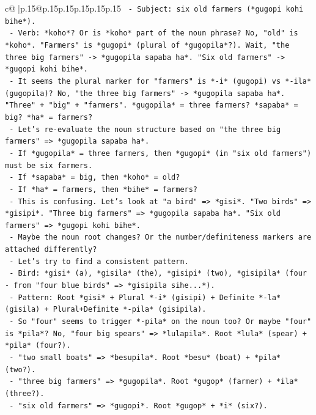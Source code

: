 \documentclass{article}
\begin{document}
{\begin{supertabular}{c@{$\;$}|p{.15\linewidth}@{}p{.15\linewidth}p{.15\linewidth}p{.15\linewidth}p{.15\linewidth}p{.15\linewidth}}
{{{\texttt{       {-} Subject: six old farmers (*gugopi kohi bihe*).} \\
\texttt{       {-} Verb: *koho*? Or is *koho* part of the noun phrase? No, "old" is *koho*. "Farmers" is *gugopi* (plural of *gugopila*?). Wait, "the three big farmers" {-}> *gugopila sapaba ha*. "Six old farmers" {-}> *gugopi kohi bihe*.} \\
\texttt{       {-} It seems the plural marker for "farmers" is *{-}i* (gugopi) vs *{-}ila* (gugopila)? No, "the three big farmers" {-}> *gugopila sapaba ha*. "Three" + "big" + "farmers". *gugopila* = three farmers? *sapaba* = big? *ha* = farmers?} \\
\texttt{       {-} Let's re{-}evaluate the noun structure based on "the three big farmers" => *gugopila sapaba ha*.} \\
\texttt{         {-} If *gugopila* = three farmers, then *gugopi* (in "six old farmers") must be six farmers.} \\
\texttt{         {-} If *sapaba* = big, then *koho* = old?} \\
\texttt{         {-} If *ha* = farmers, then *bihe* = farmers?} \\
\texttt{       {-} This is confusing. Let's look at "a bird" => *gisi*. "Two birds" => *gisipi*. "Three big farmers" => *gugopila sapaba ha*. "Six old farmers" => *gugopi kohi bihe*.} \\
\texttt{       {-} Maybe the noun root changes? Or the number/definiteness markers are attached differently?} \\
\texttt{       {-} Let's try to find a consistent pattern.} \\
\texttt{         {-} Bird: *gisi* (a), *gisila* (the), *gisipi* (two), *gisipila* (four {-} from "four blue birds" => *gisipila sihe...*).} \\
\texttt{           {-} Pattern: Root *gisi* + Plural *{-}i* (gisipi) + Definite *{-}la* (gisila) + Plural+Definite *{-}pila* (gisipila).} \\
\texttt{           {-} So "four" seems to trigger *{-}pila* on the noun too? Or maybe "four" is *pila*? No, "four big spears" => *lulapila*. Root *lula* (spear) + *pila* (four?).} \\
\texttt{           {-} "two small boats" => *besupila*. Root *besu* (boat) + *pila* (two?).} \\
\texttt{           {-} "three big farmers" => *gugopila*. Root *gugop* (farmer) + *ila* (three?).} \\
\texttt{           {-} "six old farmers" => *gugopi*. Root *gugop* + *i* (six?).} \\
}}}
\end{supertabular}}
\end{document}
